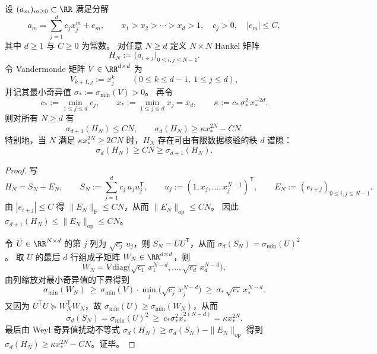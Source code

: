 \begin{theorem}\label{thm:pom-hankel-finite-pole-spectral-gap}
设 \((a_m)_{m\ge 0}\subset\RR\) 满足分解
\[
a_m=\sum_{j=1}^{d}c_j x_j^{m}+e_m,
\qquad
x_1>x_2>\cdots>x_d>1,\quad
c_j>0,\quad
|e_m|\le C,
\]
其中 \(d\ge 1\) 与 \(C\ge 0\) 为常数。
对任意 \(N\ge d\) 定义 \(N\times N\) Hankel 矩阵
\[
H_N:=\bigl(a_{i+j}\bigr)_{0\le i,j\le N-1}.
\]
令 Vandermonde 矩阵 \(V\in\RR^{d\times d}\) 为
\[
V_{k+1,j}:=x_j^{k}\qquad(0\le k\le d-1,\ 1\le j\le d),
\]
并记其最小奇异值 \(\sigma_\ast:=\sigma_{\min}(V)>0\)。
再令
\[
c_\ast:=\min_{1\le j\le d}c_j,
\qquad
x_\ast:=\min_{1\le j\le d}x_j=x_d,
\qquad
\kappa:=c_\ast\,\sigma_\ast^2\,x_\ast^{-2d}.
\]
则对所有 \(N\ge d\) 有
\[
\sigma_{d+1}(H_N)\le CN,
\qquad
\sigma_{d}(H_N)\ge \kappa x_\ast^{2N}-CN.
\]
特别地，当 \(N\) 满足 \(\kappa x_\ast^{2N}\ge 2CN\) 时，\(H_N\) 存在可由有限数据核验的秩 \(d\) 谱隙：
\[
\sigma_d(H_N)\ge CN\ge \sigma_{d+1}(H_N).
\]
\end{theorem}
\begin{proof}
写
\[
H_N=S_N+E_N,\qquad
S_N:=\sum_{j=1}^{d}c_j\,u_j u_j^{\mathsf T},
\qquad
u_j:=(1,x_j,\dots,x_j^{N-1})^{\mathsf T},
\qquad
E_N:=(e_{i+j})_{0\le i,j\le N-1}.
\]
由 \(|e_{i+j}|\le C\) 得 \(\|E_N\|_{\mathrm{F}}\le CN\)，从而 \(\|E_N\|_{\mathrm{op}}\le CN\)。
因此 \(\sigma_{d+1}(H_N)\le \|E_N\|_{\mathrm{op}}\le CN\)。
\par
令 \(U\in\RR^{N\times d}\) 的第 \(j\) 列为 \(\sqrt{c_j}\,u_j\)，则 \(S_N=UU^{\mathsf T}\)，从而
\(
\sigma_d(S_N)=\sigma_{\min}(U)^2
\)。
取 \(U\) 的最后 \(d\) 行组成子矩阵 \(W_N\in\RR^{d\times d}\)，则
\[
W_N
=V\,\mathrm{diag}\!\bigl(\sqrt{c_1}\,x_1^{N-d},\dots,\sqrt{c_d}\,x_d^{N-d}\bigr),
\]
由列缩放对最小奇异值的下界得到
\[
\sigma_{\min}(W_N)\ \ge\ \sigma_{\min}(V)\cdot\min_{j}\bigl(\sqrt{c_j}\,x_j^{N-d}\bigr)
\ \ge\ \sigma_\ast\,\sqrt{c_\ast}\,x_\ast^{N-d}.
\]
又因为 \(U^{\mathsf T}U\succeq W_N^{\mathsf T}W_N\)，故 \(\sigma_{\min}(U)\ge \sigma_{\min}(W_N)\)，从而
\[
\sigma_d(S_N)=\sigma_{\min}(U)^2
\ \ge\
c_\ast\sigma_\ast^2 x_\ast^{2(N-d)}
=\kappa x_\ast^{2N}.
\]
最后由 Weyl 奇异值扰动不等式
\(
\sigma_d(H_N)\ge \sigma_d(S_N)-\|E_N\|_{\mathrm{op}}
\)
得到 \(\sigma_d(H_N)\ge \kappa x_\ast^{2N}-CN\)。证毕。
\end{proof}

